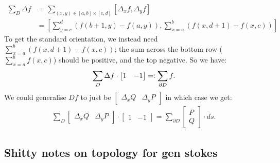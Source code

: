 \documentclass{article}
\newcommand{\vc}{\vcentcolon}
\theoremstyle{definition}
\begin{document}
\begin{align*}
	\sum_D\Delta f&=\sum_{(x,y)\in[a,b]\times[c,d]}\left[\Delta_xf,\Delta_yf\right]\\
	&=\left[\sum_{y=c}^d\left(f(b+1,y)-f(a,y)\right),\sum_{x=a}^b\left(f(x,d+1)-f(x,c)\right)\right]
\end{align*}
To get the standard orientation, we instead need $\sum_{x=a}^b\left(f(x,d+1)-f(x,c)\right)$; the sum across the bottom row ($\sum_{x=a}^bf(x,c)$) should be positive, and the top negative. So we have:
\begin{align*}
	\sum_D\Delta f\cdot\begin{bmatrix}1&-1\end{bmatrix}=\vc\sum_{\partial D}f.
\end{align*}
We could generalise $Df$ to just be $\begin{bmatrix}\Delta_xQ&\Delta_yP\end{bmatrix}$ in which case we get:
\begin{align*}
	\sum_D\begin{bmatrix}\Delta_xQ&\Delta_yP\end{bmatrix}\cdot\begin{bmatrix}1&-1\end{bmatrix}=\sum_{\partial D}\begin{bmatrix}P\\Q\end{bmatrix}\cdot ds.
\end{align*}




\newpage
\subsection{Shitty notes on topology for gen stokes}
\end{document}
